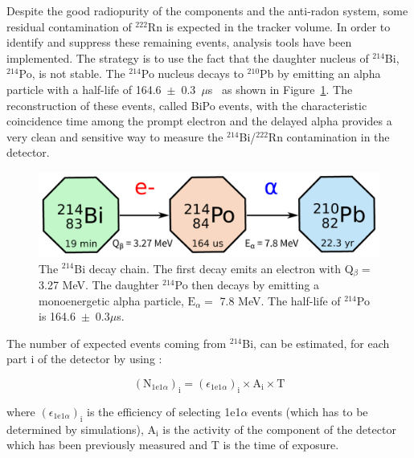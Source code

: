 \documentclass[main.tex]{subfiles}
\begin{document}
\noindent Despite the good radiopurity of the components and the anti-radon system, some residual contamination of $^{\text{222}}$Rn is expected in the tracker volume. In order to identify and suppress these remaining events, analysis tools have been implemented. The strategy is to use the fact that the daughter nucleus of $^{\text{214}}$Bi, $^{\text{214}}$Po, is not stable. The $^{\text{214}}$Po nucleus decays to $^{\text{210}}$Pb by emitting an alpha particle with a half-life of 164.6~$\pm$~0.3~$\mu$s~\cite{NuclearDataSheet210} as shown in Figure~\ref{BiPoChain}. The reconstruction of these events, called BiPo events, with the characteristic coincidence time among the prompt electron and the delayed alpha provides a very clean and sensitive way to measure the $^{\text{214}}$Bi/$^{\text{222}}$Rn contamination in the detector.   


\begin{figure}[h!]
\begin{center}
\includegraphics[scale=0.6]{pictures/Chap5/decay_chain_bi.pdf}
\caption{The $^{\text{214}}$Bi decay chain. The first decay emits an electron with Q$_{\beta} =$ 3.27 MeV. The daughter $^{\text{214}}$Po then decays by emitting a monoenergetic alpha particle, $\text{E}_{\alpha} =$ 7.8 MeV. The half-life of $^{\text{214}}$Po is 164.6~$\pm$~0.3$\mu$s.}
\label{BiPoChain}
\end{center}
\end{figure}


\bigskip


\NI The number of expected events coming from $^{\text{214}}$Bi, can be estimated, for each part i of the detector by using :


\begin{equation}
(\text{N}_{\text{1e1}\alpha})_\text{i} = (\epsilon_{\text{1e1}\alpha})_\text{i} \times \text{A}_\text{i} \times \text{T}
\label{eq_number_of_expected_events}
\end{equation}


\noindent where $(\epsilon_{\text{1e1}\alpha})_\text{i}$ is the efficiency of selecting 1e1$\alpha$ events (which has to be determined by simulations), A$_\text{i}$ is the activity of the component of the detector which has been previously measured and T is the time of exposure. 
\end{document}
